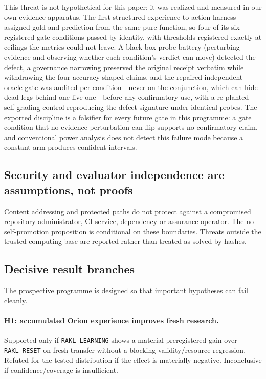 This threat is not hypothetical for this paper; it was realized and measured in our own evidence apparatus. The first structured experience-to-action harness assigned gold and prediction from the same pure function, so four of its six registered gate conditions passed by identity, with thresholds registered exactly at ceilings the metrics could not leave. A black-box probe battery (perturbing evidence and observing whether each condition's verdict can move) detected the defect, a governance narrowing preserved the original receipt verbatim while withdrawing the four accuracy-shaped claims, and the repaired independent-oracle gate was audited per condition---never on the conjunction, which can hide dead legs behind one live one---before any confirmatory use, with a re-planted self-grading control reproducing the defect signature under identical probes. The exported discipline is a falsifier for every future gate in this programme: a gate condition that no evidence perturbation can flip supports no confirmatory claim, and conventional power analysis does not detect this failure mode because a constant arm produces confident intervals.

\subsection{Security and evaluator independence are assumptions, not proofs}

Content addressing and protected paths do not protect against a compromised repository administrator, CI service, dependency or assurance operator. The no-self-promotion proposition is conditional on these boundaries. Threats outside the trusted computing base are reported rather than treated as solved by hashes.

\subsection{Decisive result branches}

The prospective programme is designed so that important hypotheses can fail cleanly.

\paragraph{H1: accumulated Orion experience improves fresh research.}
Supported only if \texttt{RAKL\_LEARNING} shows a material preregistered gain over \texttt{RAKL\_RESET} on fresh transfer without a blocking validity/resource regression. Refuted for the tested distribution if the effect is materially negative. Inconclusive if confidence/coverage is insufficient.

